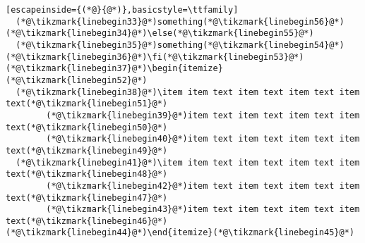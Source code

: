 \documentclass[11pt]{article}
\newcommand{\tikzmark}[1]{%
  \tikz[overlay,remember picture] \node[text=black,
    inner sep=2pt] (#1) {};}
\begin{document}
\begin{lstlisting}[escapeinside={(*@}{@*)},basicstyle=\ttfamily]
  (*@\tikzmark{linebegin33}@*)something(*@\tikzmark{linebegin56}@*)
(*@\tikzmark{linebegin34}@*)\else(*@\tikzmark{linebegin55}@*)
  (*@\tikzmark{linebegin35}@*)something(*@\tikzmark{linebegin54}@*)
(*@\tikzmark{linebegin36}@*)\fi(*@\tikzmark{linebegin53}@*)
(*@\tikzmark{linebegin37}@*)\begin{itemize}(*@\tikzmark{linebegin52}@*)
  (*@\tikzmark{linebegin38}@*)\item item text item text item text item text(*@\tikzmark{linebegin51}@*)
        (*@\tikzmark{linebegin39}@*)item text item text item text item text(*@\tikzmark{linebegin50}@*)
        (*@\tikzmark{linebegin40}@*)item text item text item text item text(*@\tikzmark{linebegin49}@*)
  (*@\tikzmark{linebegin41}@*)\item item text item text item text item text(*@\tikzmark{linebegin48}@*)
        (*@\tikzmark{linebegin42}@*)item text item text item text item text(*@\tikzmark{linebegin47}@*)
        (*@\tikzmark{linebegin43}@*)item text item text item text item text(*@\tikzmark{linebegin46}@*)
(*@\tikzmark{linebegin44}@*)\end{itemize}(*@\tikzmark{linebegin45}@*)
\end{lstlisting}
\end{document}
